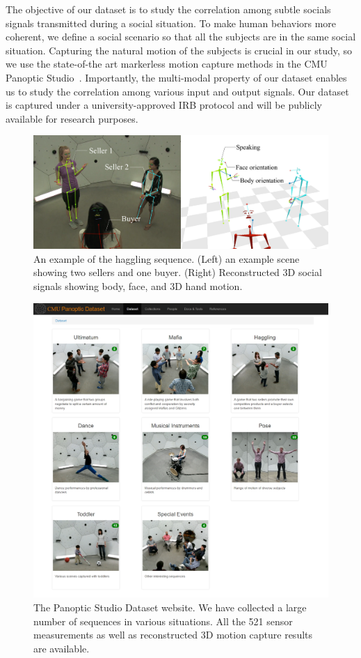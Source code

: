 The objective of our dataset is to study the correlation among subtle socials signals transmitted during a social situation. To make human behaviors more coherent, we define a social scenario so that all the subjects are in the same social situation. Capturing the natural motion of the subjects is crucial in our study, so we use the state-of-the art markerless motion capture methods in the CMU Panoptic Studio~\cite{joo2017panoptic, joo2018}. Importantly, the multi-modal property of our dataset enables us to study the correlation among various input and output signals. Our dataset is captured under a university-approved IRB protocol and will be publicly available for research purposes.
\begin{figure}
	\centering
	\includegraphics[width=\linewidth]{ssp_fig/haggling_ex}
	\caption{An example of the haggling sequence. (Left) an example scene showing two sellers and one buyer. (Right) Reconstructed 3D social signals showing body, face, and 3D hand motion.} 
	\label{fig:hagglign_ex}
\end{figure}


\begin{figure}
	\centering
	\includegraphics[height=0.95\textwidth]{figures/domedb}
	\caption{The Panoptic Studio Dataset website. We have collected a large number of sequences in various situations. All the 521 sensor measurements as well as reconstructed 3D motion capture results are available.} 
	\label{fig:domedb}
\end{figure}

